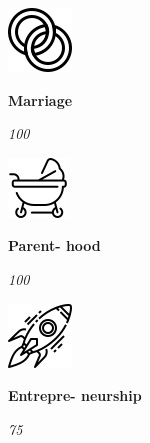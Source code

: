 \documentclass[
]{article}
\begin{document}
\begin{minipage}[c][3.5cm][t]{2.1cm}\begin{mybox}\centering
\vspace{.3cm}
\includegraphics[height=.75cm]{marriage.png}

\vspace{.3cm}
\fontsize{7.5}{1}\selectfont   
\textbf{Marriage}\normalsize 

\vspace{20pt}
\fontsize{14}{1}\selectfont 
\emph{100}
\vspace{.3cm}
\normalsize\end{mybox}\end{minipage}
\begin{minipage}[c][3.5cm][t]{2.1cm}\begin{mybox}\centering
\vspace{.3cm}
\includegraphics[height=.75cm]{parenthood.png}

\vspace{.3cm}
\fontsize{7.5}{1}\selectfont   
\textbf{Parent-
hood}\normalsize 

\vspace{12pt}
\fontsize{14}{1}\selectfont 
\emph{100}

\vspace{.3cm}
\normalsize\end{mybox}\end{minipage}
\begin{minipage}[c][3.5cm][t]{2.1cm}\begin{mybox}\centering

\vspace{.3cm}
\includegraphics[height=.75cm]{entrepreneur.png}

\vspace{.3cm}
\fontsize{7.5}{1}\selectfont   
\textbf{Entrepre-
neurship}\normalsize 

\vspace{12pt}
\fontsize{14}{1}\selectfont 

\emph{75}
\vspace{.3cm}
\normalsize\end{mybox}\end{minipage}
\end{document}
